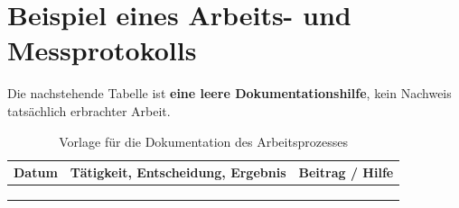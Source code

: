 \chapter{Beispiel eines Arbeits- und Messprotokolls}
\label{app:protokoll}
Die nachstehende Tabelle ist \textbf{eine leere Dokumentationshilfe},
kein Nachweis tatsächlich erbrachter Arbeit.

\begin{table}[htbp]
\centering
\caption{Vorlage für die Dokumentation des Arbeitsprozesses}
\label{tab:arbeitslog}
\begin{tabularx}{\linewidth}{@{}p{2.1cm}X p{2.6cm}@{}}
\toprule
Datum & Tätigkeit, Entscheidung, Ergebnis & Beitrag / Hilfe \\
\midrule
\rule{0pt}{2.2em} & & \\
\midrule
\rule{0pt}{2.2em} & & \\
\midrule
\rule{0pt}{2.2em} & & \\
\bottomrule
\end{tabularx}
\end{table}

